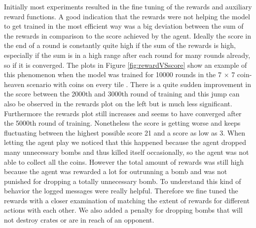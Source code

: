 Initially most experiments resulted in the fine tuning of the rewards and auxiliary reward functions. A good indication that the rewards were not helping the model to get trained in the most efficient way was a big deviation between the sum of the rewards in comparison to the score achieved by the agent. Ideally the score in the end of a round is constantly quite high if the sum of the rewards is high, especially if the sum is in a high range after each round for many rounds already, so if it is converged. The plots in Figure \ref{fig:rewardVSscore} show an example of this phenomenon when the model was trained for 10000 rounds in the 7 $\times$ 7 coin-heaven scenario with coins on every tile . There is a quite sudden improvement in the score between the 2000th and 3000th round of training and this jump can also be observed in the rewards plot on the left but is much less significant. Furthermore the rewards plot still increases and seems to have converged after the 5000th round of training. Nonetheless the score is getting worse and keeps fluctuating between the highest possible score 21 and a score as low as 3. When letting the agent play we noticed that this happened because the agent dropped many unnecessary bombs and thus killed itself occasionally, so the agent was not able to collect all the coins. However the total amount of rewards was still high because the agent was rewarded a lot for outrunning a bomb and was not punished for dropping a totally unnecessary bomb. To understand this kind of behavior the logged messages were really helpful. Therefore we fine tuned the rewards with a closer examination of matching the extent of rewards for different actions with each other. We also added a penalty for dropping bombs that will not destroy crates or are in reach of an opponent. 
